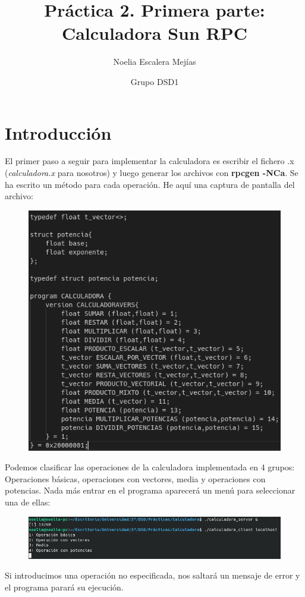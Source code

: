 \documentclass{article}
\title{Práctica 2. Primera parte: Calculadora Sun RPC}
\author{Noelia Escalera Mejías \and Grupo DSD1}
\begin{document}
	\maketitle
	\tableofcontents
	\newpage
	\section{Introducción}
	El primer paso a seguir para implementar la calculadora es escribir el fichero .x ({\it calculadora.x} para nosotros) y luego generar los archivos con {\bf rpcgen -NCa}. Se ha escrito un método para cada operación. He aquí una captura de pantalla del archivo:
	
	\begin{figure}[H]
		\centering
		\includegraphics[totalheight=11.5cm]{img/2.png}
	\end{figure}
	
	Podemos clasificar las operaciones de la calculadora implementada en 4 grupos: Operaciones básicas, operaciones con vectores, media y operaciones con potencias. Nada más entrar en el programa aparecerá un menú para seleccionar una de ellas:
	\begin{figure}[H]
		\centering
		\includegraphics[totalheight=2cm]{img/1.png}
	\end{figure}
	Si introducimos una operación no especificada, nos saltará un mensaje de error y el programa parará su ejecución.
	
\end{document}
